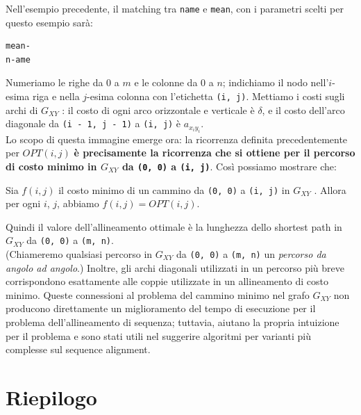Nell'esempio precedente, il matching tra \texttt{name} e \texttt{mean}, con i
parametri scelti per questo esempio sarà:

\begin{verbatim}
mean-
n-ame
\end{verbatim}

Numeriamo le righe da 0 a $m$ e le colonne da 0 a $n$; indichiamo il
nodo nell'$i$-esima riga e nella $j$-esima colonna con l'etichetta
\texttt{(i,\ j)}. Mettiamo i costi sugli archi di $G_{XY}$ : il costo
di ogni arco orizzontale e verticale è $\delta$, e il costo dell'arco
diagonale da \texttt{(i\ -\ 1,\ j\ -\ 1)} a \texttt{(i,\ j)} è
$a_{x_i y_i}$.\\ Lo scopo di questa immagine emerge ora: la ricorrenza
definita precedentemente per $OPT(i, j)$ \textbf{è precisamente la
	ricorrenza che si ottiene per il percorso di costo minimo in $G_{XY}$
	da \texttt{(0,\ 0)} a \texttt{(i,\ j)}}. Così possiamo mostrare che:
\begin{myblockquote}
	Sia $f(i, j)$ il costo minimo di un cammino da
	\texttt{(0,\ 0)} a \texttt{(i,\ j)} in $G_{XY}$ . Allora per ogni
	$i$, $j$, abbiamo $f(i, j) = OPT(i, j)$.
\end{myblockquote}

Quindi il valore dell'allineamento ottimale è la lunghezza dello
shortest path in $G_{XY}$ da \texttt{(0,\ 0)} a \texttt{(m,\ n)}.\\
(Chiameremo qualsiasi percorso in $G_{XY}$ da \texttt{(0,\ 0)} a
\texttt{(m,\ n)} un \emph{percorso da angolo ad angolo}.) Inoltre, gli
archi diagonali utilizzati in un percorso più breve corrispondono
esattamente alle coppie utilizzate in un allineamento di costo minimo.
Queste connessioni al problema del cammino minimo nel grafo $G_{XY}$
non producono direttamente un miglioramento del tempo di esecuzione per
il problema dell'allineamento di sequenza; tuttavia, aiutano la propria
intuizione per il problema e sono stati utili nel suggerire algoritmi
per varianti più complesse sul sequence alignment.

\section{Riepilogo}

